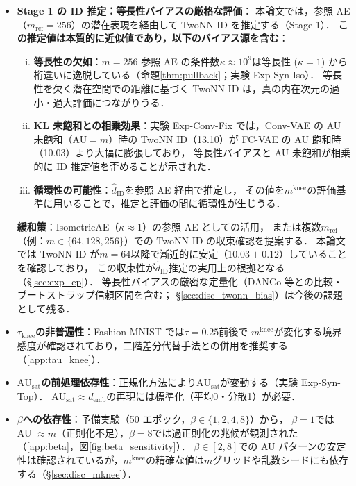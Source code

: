 \documentclass[11pt,a4paper]{jsarticle}
\newcommand{\kap}{\kappa}
\newcommand{\AUsat}{\mathrm{AU}_{\mathrm{sat}}}
\newcommand{\mknee}{m^{\mathrm{knee}}}
\newcommand{\demb}{d_{\mathrm{emb}}}
\begin{document}
\begin{itemize}
  \item \textbf{Stage 1 の ID 推定：等長性バイアスの厳格な評価}：
        本論文では，参照 AE（$m_\mathrm{ref}=256$）の潜在表現を経由して TwoNN ID を推定する（Stage 1）．
        \textbf{この推定値は本質的に近似値であり，以下のバイアス源を含む}：
        \begin{enumerate}[(i)]
          \item \textbf{等長性の欠如}：$m=256$ 参照 AE の条件数$\kap \approx 10^9$は等長性
                ($\kap=1$) から桁違いに逸脱している（命題\ref{thm:pullback}；実験 Exp-Syn-Iso）．
                等長性を欠く潜在空間での距離に基づく TwoNN ID は，真の内在次元の過小・過大評価につながりうる．
          \item \textbf{KL 未飽和との相乗効果}：実験 Exp-Conv-Fix では，Conv-VAE の AU 未飽和（AU$=m$）時の
                TwoNN ID（13.10）が FC-VAE の AU 飽和時（10.03）より大幅に膨張しており，
                等長性バイアスと AU 未飽和が相乗的に ID 推定値を歪めることが示された．
          \item \textbf{循環性の可能性}：$\hat{d}_\mathrm{ID}$を参照 AE 経由で推定し，
                その値を$\mknee$の評価基準に用いることで，推定と評価の間に循環性が生じうる．
        \end{enumerate}
        \textbf{緩和策}：IsometricAE（$\kap \approx 1$）の参照 AE としての活用，
        または複数$m_\mathrm{ref}$（例：$m \in \{64, 128, 256\}$）での TwoNN ID の収束確認を提案する．
        本論文では TwoNN ID が$m=64$以降で漸近的に安定（$10.03 \pm 0.12$）していることを確認しており，
        この収束性が$\hat{d}_\mathrm{ID}$推定の実用上の根拠となる（§\ref{sec:exp_ep}）．
        等長性バイアスの厳密な定量化（DANCo 等との比較・ブートストラップ信頼区間を含む；
        §\ref{sec:disc_twonn_bias}）は今後の課題として残る．
  \item \textbf{$\tau_{\mathrm{knee}}$の非普遍性}：Fashion-MNIST では$\tau = 0.25$前後で
        $\mknee$が変化する境界感度が確認されており，二階差分代替手法との併用を推奨する
        （\ref{app:tau_knee}）．
  \item \textbf{$\AUsat$の前処理依存性}：正規化方法により$\AUsat$が変動する（実験 Exp-Syn-Top）．
        $\AUsat \approx \demb$の再現には標準化（平均0・分散1）が必要．
  \item \textbf{$\beta$への依存性}：予備実験（50 エポック，$\beta \in \{1,2,4,8\}$）から，
        $\beta = 1$では AU $\approx m$（正則化不足），$\beta = 8$では過正則化の兆候が観測された
        （\ref{app:beta}，図\ref{fig:beta_sensitivity}）．
        $\beta \in [2, 8]$での AU パターンの安定性は確認されているが，$\mknee$の精確な値は$m$グリッドや乱数シードにも依存する（§\ref{sec:disc_mknee}）．
\end{itemize}
\end{document}
